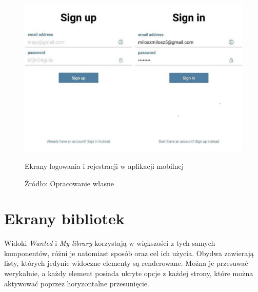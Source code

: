 \begin{figure}[H]
	\centering
	\includegraphics[width=\linewidth]{signin_signup.pdf}
	\caption{\centering Ekrany logowania i rejestracji w aplikacji mobilnej}
	\caption*{\centering Źródło: {Opracowanie własne}}
\end{figure}
\section{Ekrany bibliotek}
Widoki \textit{Wanted} i \textit{My library} korzystają w większości z tych samych komponentów, różni je natomiast sposób oraz cel ich użycia. Obydwa zawierają listy, których jedynie widoczne elementy są renderowane. Można je przesuwać werykalnie, a każdy element posiada ukryte opcje z każdej strony, które można aktywować poprzez horyzontalne przesunięcie.


